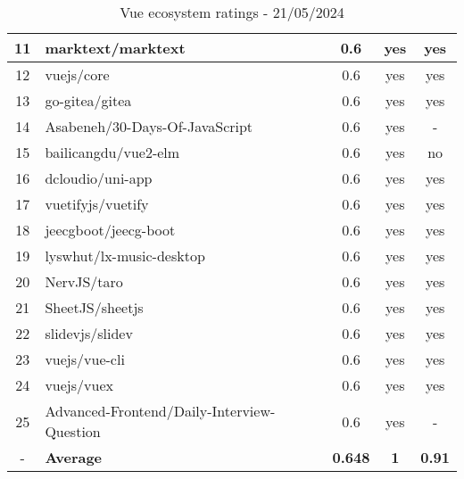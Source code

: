 \begin{table}[H]
{\begin{tabular}{|c|l|c|c|c|}
            11 & marktext/marktext                          & 0.6                & yes                        & yes                \\ \hline
            12 & vuejs/core                                 & 0.6                & yes                        & yes                \\ \hline
            13 & go-gitea/gitea                             & 0.6                & yes                        & yes                \\ \hline
            14 & Asabeneh/30-Days-Of-JavaScript             & 0.6                & yes                        & -                  \\ \hline
            15 & bailicangdu/vue2-elm                       & 0.6                & yes                        & no                 \\ \hline
            16 & dcloudio/uni-app                           & 0.6                & yes                        & yes                \\ \hline
            17 & vuetifyjs/vuetify                          & 0.6                & yes                        & yes                \\ \hline
            18 & jeecgboot/jeecg-boot                       & 0.6                & yes                        & yes                \\ \hline
            19 & lyswhut/lx-music-desktop                   & 0.6                & yes                        & yes                \\ \hline
            20 & NervJS/taro                                & 0.6                & yes                        & yes                \\ \hline
            21 & SheetJS/sheetjs                            & 0.6                & yes                        & yes                \\ \hline
            22 & slidevjs/slidev                            & 0.6                & yes                        & yes                \\ \hline
            23 & vuejs/vue-cli                              & 0.6                & yes                        & yes                \\ \hline
            24 & vuejs/vuex                                 & 0.6                & yes                        & yes                \\ \hline
            25 & Advanced-Frontend/Daily-Interview-Question & 0.6                & yes                        & -                  \\ \hline
            -  & \textbf{Average}                           & \textbf{0.648}     & \textbf{1}                 & \textbf{0.91}      \\ \hline
        \end{tabular}
    }
    \caption{Vue ecosystem ratings - 21/05/2024}
    \label{tab:metrics:vue:ratings}
\end{table}


